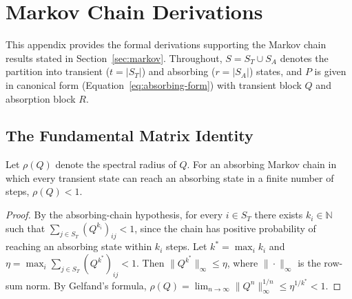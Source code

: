 %


\chapter{Markov Chain Derivations}
\label{app:A}

This appendix provides the formal derivations supporting the Markov chain
results stated in Section~\ref{sec:markov}. Throughout, $S = S_T \cup S_A$
denotes the partition into transient ($t = |S_T|$) and absorbing
($r = |S_A|$) states, and $P$ is given in canonical form
(Equation~\ref{eq:absorbing-form}) with transient block $Q$ and absorption
block $R$.


\section{The Fundamental Matrix Identity}
\label{app:A-fundamental}

\begin{lemma}
\label{lem:spectral-radius}
Let $\rho(Q)$ denote the spectral radius of $Q$. For an absorbing Markov
chain in which every transient state can reach an absorbing state in a
finite number of steps, $\rho(Q) < 1$.
\end{lemma}

\begin{proof}
By the absorbing-chain hypothesis, for every $i \in S_T$ there exists
$k_i \in \mathbb{N}$ such that $\sum_{j \in S_T} (Q^{k_i})_{ij} < 1$, since
the chain has positive probability of reaching an absorbing state within
$k_i$ steps. Let $k^* = \max_i k_i$ and
$\eta = \max_i \sum_{j \in S_T} (Q^{k^*})_{ij} < 1$. Then
$\| Q^{k^*} \|_\infty \leq \eta$, where $\|\cdot\|_\infty$ is the row-sum
norm. By Gelfand's formula, $\rho(Q) = \lim_{n \to \infty}
\| Q^n \|_\infty^{1/n} \leq \eta^{1/k^*} < 1$.
\end{proof}

